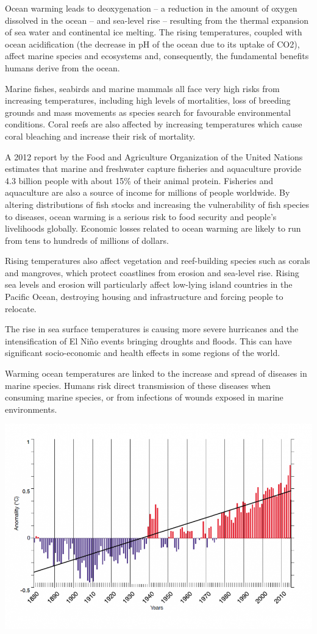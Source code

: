 \documentclass[
]{book}
\begin{document}
Ocean warming leads to deoxygenation -- a reduction in the amount of oxygen dissolved in the ocean -- and sea-level rise -- resulting from the thermal expansion of sea water and continental ice melting. The rising temperatures, coupled with ocean acidification (the decrease in pH of the ocean due to its uptake of CO2), affect marine species and ecosystems and, consequently, the fundamental benefits humans derive from the ocean.

Marine fishes, seabirds and marine mammals all face very high risks from increasing temperatures, including high levels of mortalities, loss of breeding grounds and mass movements as species search for favourable environmental conditions. Coral reefs are also affected by increasing temperatures which cause coral bleaching and increase their risk of mortality.

A 2012 report by the Food and Agriculture Organization of the United Nations estimates that marine and freshwater capture fisheries and aquaculture provide 4.3 billion people with about 15\% of their animal protein. Fisheries and aquaculture are also a source of income for millions of people worldwide. By altering distributions of fish stocks and increasing the vulnerability of fish species to diseases, ocean warming is a serious risk to food security and people's livelihoods globally. Economic losses related to ocean warming are likely to run from tens to hundreds of millions of dollars.

Rising temperatures also affect vegetation and reef-building species such as corals and mangroves, which protect coastlines from erosion and sea-level rise. Rising sea levels and erosion will particularly affect low-lying island countries in the Pacific Ocean, destroying housing and infrastructure and forcing people to relocate.

The rise in sea surface temperatures is causing more severe hurricanes and the intensification of El Niño events bringing droughts and floods. This can have significant socio-economic and health effects in some regions of the world.

Warming ocean temperatures are linked to the increase and spread of diseases in marine species. Humans risk direct transmission of these diseases when consuming marine species, or from infections of wounds exposed in marine environments.

\includegraphics{fig/sea_surface_tmp.png}
\end{document}
